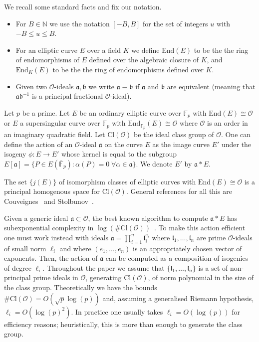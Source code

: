 \documentclass{llncs}
\newcommand{\F}{\mathbb{F}}
\newcommand{\Fpbar}{\overline{\mathbb{F}}_p}
\newcommand{\N}{\mathbb{N}}
\newcommand{\OO}{\mathcal{O}}
\newcommand{\End}{\text{End}}
\newcommand{\Cl}{\text{Cl}}
\renewcommand{\a}{\mathfrak{a}}
\renewcommand{\b}{\mathfrak{b}}
\renewcommand{\l}{\mathfrak{l}}
\begin{document}
We recall some standard facts and fix our notation.

\begin{itemize}
\item For $B \in \N$ we use the notation $[-B,B]$ for the set of integers $u$ with $-B \le u \le B$.

\item For an elliptic curve $E$ over a field $K$ we define $\End(E)$ to be the the ring of endomorphisms of $E$ defined over the algebraic closure of $K$, and $\End_K(E)$ to be the the ring of endomorphisms defined over $K$.
\item Given two $\OO$-ideals $\a, \b$ we write $\a \equiv \b$ if $\a$ and $\b$ are equivalent (meaning that $\a \b^{-1}$ is a principal fractional $\OO$-ideal). 
\end{itemize}


Let $p$ be a prime.
Let $E$ be an ordinary elliptic curve over $\F_p$ with $\End(E) \cong \OO$ or $E$ a supersingular curve over $\F_p$ with $\End_{\F_p}(E) \cong \OO$ where $\OO$ is an order in an imaginary quadratic field.
Let $\Cl(\OO )$ be the ideal class group of $\OO$.
One can define the action of an $\OO$-ideal $\a$ on the curve $E$ as the image curve $E'$ under the isogeny $\phi : E \to E'$ whose kernel is equal to the subgroup $E[ \a ] = \{ P \in E( \Fpbar ) : \alpha(P) = 0 \; \forall \alpha \in \a \}$.
We denote $E'$ by $\a * E$.

The set $\{ j(E) \}$ of isomorphism classes of elliptic curves with $\End(E) \cong \OO$ is a principal homogenous space for $\Cl(\OO )$.
General references for all this are Couveignes~\cite{Couv06}
and Stolbunov~\cite{Sto12}.

Given a generic ideal $\a\subset\OO$, the best known algorithm to compute $\a*E$ has subexponential complexity in $\log(\#\Cl(\OO))$~\cite{JS10}.
To make this action efficient one must work instead with ideals $\a = \prod_{i=1}^n \l_i^{e_i}$ where $\l_1, \dots, \l_n$ are prime $\OO$-ideals of small norm $\ell_i$ and where $(e_1, \dots, e_n)$ is an appropriately chosen vector of exponents.
Then, the action of $\a$ can be computed as a composition of isogenies of degree $\ell_i$.
Throughout the paper we assume that $\{ \l_1, \dots, \l_n \}$ is a set of non-principal prime ideals in $\OO$, generating $\Cl(\OO)$, of norm polynomial in the size of the class group.
Theoretically we have the bounds $\#\Cl(\OO) = O( \sqrt{p} \log(p) )$ and, assuming a generalised Riemann hypothesis, $\ell_i = O( \log(p)^2 )$.
In practice one usually takes $\ell_i=O(\log(p))$ for efficiency reasons; heuristically, this is more than enough to generate the class group.
\end{document}
